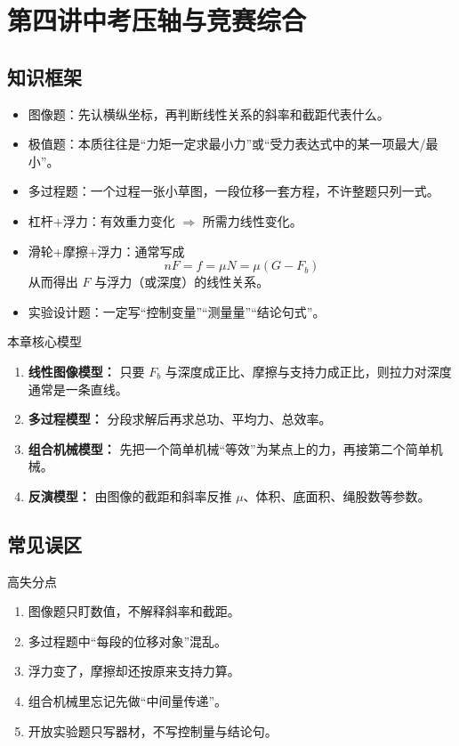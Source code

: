 \documentclass[12pt,a4paper]{ctexart}
\begin{document}
\clearpage
\section{第四讲\texorpdfstring{\quad}{ }中考压轴与竞赛综合}

\subsection{知识框架}
\begin{itemize}[leftmargin=2.2em]
\item 图像题：先认横纵坐标，再判断线性关系的斜率和截距代表什么。
\item 极值题：本质往往是“力矩一定求最小力”或“受力表达式中的某一项最大/最小”。
\item 多过程题：一个过程一张小草图，一段位移一套方程，不许整题只列一式。
\item 杠杆+浮力：有效重力变化 $\Rightarrow$ 所需力线性变化。
\item 滑轮+摩擦+浮力：通常写成
\[
nF=f=\mu N=\mu (G-F_b)
\]
从而得出 $F$ 与浮力（或深度）的线性关系。
\item 实验设计题：一定写“控制变量”“测量量”“结论句式”。
\end{itemize}

\begin{modelbox}{本章核心模型}
\begin{enumerate}[label=\arabic*.]
\item \textbf{线性图像模型：} 只要 $F_b$ 与深度成正比、摩擦与支持力成正比，则拉力对深度通常是一条直线。
\item \textbf{多过程模型：} 分段求解后再求总功、平均力、总效率。
\item \textbf{组合机械模型：} 先把一个简单机械“等效”为某点上的力，再接第二个简单机械。
\item \textbf{反演模型：} 由图像的截距和斜率反推 $\mu$、体积、底面积、绳股数等参数。
\end{enumerate}
\end{modelbox}

\subsection{常见误区}
\begin{pitfallbox}{高失分点}
\begin{enumerate}[label=\arabic*.]
\item 图像题只盯数值，不解释斜率和截距。
\item 多过程题中“每段的位移对象”混乱。
\item 浮力变了，摩擦却还按原来支持力算。
\item 组合机械里忘记先做“中间量传递”。
\item 开放实验题只写器材，不写控制量与结论句。
\end{enumerate}
\end{pitfallbox}
\end{document}
